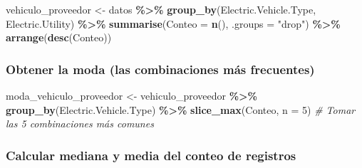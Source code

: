 \documentclass[
]{article}
\newenvironment{Shaded}{\begin{snugshade}}{\end{snugshade}}
\newcommand{\AttributeTok}[1]{\textcolor[rgb]{0.13,0.29,0.53}{#1}}
\newcommand{\CommentTok}[1]{\textcolor[rgb]{0.56,0.35,0.01}{\textit{#1}}}
\newcommand{\DecValTok}[1]{\textcolor[rgb]{0.00,0.00,0.81}{#1}}
\newcommand{\FunctionTok}[1]{\textcolor[rgb]{0.13,0.29,0.53}{\textbf{#1}}}
\newcommand{\NormalTok}[1]{#1}
\newcommand{\OtherTok}[1]{\textcolor[rgb]{0.56,0.35,0.01}{#1}}
\newcommand{\SpecialCharTok}[1]{\textcolor[rgb]{0.81,0.36,0.00}{\textbf{#1}}}
\newcommand{\StringTok}[1]{\textcolor[rgb]{0.31,0.60,0.02}{#1}}
\begin{document}
\begin{Shaded}
\begin{Highlighting}[]
\NormalTok{vehiculo\_proveedor }\OtherTok{\textless{}{-}}\NormalTok{ datos }\SpecialCharTok{\%\textgreater{}\%}
  \FunctionTok{group\_by}\NormalTok{(Electric.Vehicle.Type, Electric.Utility) }\SpecialCharTok{\%\textgreater{}\%}
  \FunctionTok{summarise}\NormalTok{(}\AttributeTok{Conteo =} \FunctionTok{n}\NormalTok{(), }\AttributeTok{.groups =} \StringTok{"drop"}\NormalTok{) }\SpecialCharTok{\%\textgreater{}\%}
  \FunctionTok{arrange}\NormalTok{(}\FunctionTok{desc}\NormalTok{(Conteo))}
\end{Highlighting}
\end{Shaded}

\subsubsection{Obtener la moda (las combinaciones más
frecuentes)}\label{obtener-la-moda-las-combinaciones-muxe1s-frecuentes}

\begin{Shaded}
\begin{Highlighting}[]
\NormalTok{moda\_vehiculo\_proveedor }\OtherTok{\textless{}{-}}\NormalTok{ vehiculo\_proveedor }\SpecialCharTok{\%\textgreater{}\%}
  \FunctionTok{group\_by}\NormalTok{(Electric.Vehicle.Type) }\SpecialCharTok{\%\textgreater{}\%}
  \FunctionTok{slice\_max}\NormalTok{(Conteo, }\AttributeTok{n =} \DecValTok{5}\NormalTok{)  }\CommentTok{\# Tomar las 5 combinaciones más comunes}
\end{Highlighting}
\end{Shaded}

\subsubsection{Calcular mediana y media del conteo de
registros}\label{calcular-mediana-y-media-del-conteo-de-registros}

\begin{Shaded}
\end{Shaded}
\end{document}
